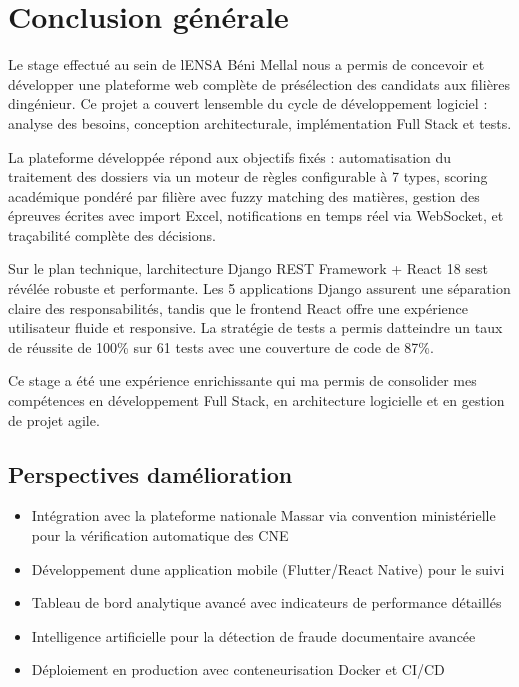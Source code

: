 \chapter{Conclusion générale}

Le stage effectué au sein de l\textquotesingle ENSA Béni Mellal nous a
permis de concevoir et développer une plateforme web complète de
présélection des candidats aux filières d\textquotesingle ingénieur. Ce
projet a couvert l\textquotesingle ensemble du cycle de développement
logiciel : analyse des besoins, conception architecturale,
implémentation Full Stack et tests.

La plateforme développée répond aux objectifs fixés : automatisation du
traitement des dossiers via un moteur de règles configurable à 7 types,
scoring académique pondéré par filière avec fuzzy matching des matières,
gestion des épreuves écrites avec import Excel, notifications en temps
réel via WebSocket, et traçabilité complète des décisions.

Sur le plan technique, l\textquotesingle architecture Django REST
Framework + React 18 s\textquotesingle est révélée robuste et
performante. Les 5 applications Django assurent une séparation claire
des responsabilités, tandis que le frontend React offre une expérience
utilisateur fluide et responsive. La stratégie de tests a permis
d\textquotesingle atteindre un taux de réussite de 100\% sur 61 tests
avec une couverture de code de 87\%.

Ce stage a été une expérience enrichissante qui m\textquotesingle a
permis de consolider mes compétences en développement Full Stack, en
architecture logicielle et en gestion de projet agile.

\section{Perspectives
d\textquotesingle amélioration}

\begin{itemize}
\item
  Intégration avec la plateforme nationale Massar via convention
  ministérielle pour la vérification automatique des CNE
\item
  Développement d\textquotesingle une application mobile (Flutter/React
  Native) pour le suivi
\item
  Tableau de bord analytique avancé avec indicateurs de performance
  détaillés
\item
  Intelligence artificielle pour la détection de fraude documentaire
  avancée
\item
  Déploiement en production avec conteneurisation Docker et CI/CD
\end{itemize}



\appendix
